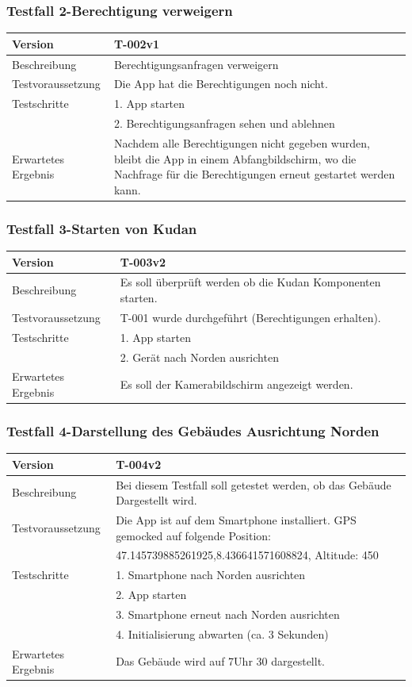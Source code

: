 \documentclass[a4paper]{scrreprt}
\begin{document}
\subsubsection{Testfall 2-Berechtigung verweigern}
\begin{tabularx}{\textwidth}{|l|X|}
\hline 
	Version &
	T-002v1 \\ 
\hline 
	Beschreibung & Berechtigungsanfragen verweigern \\ 
\hline 
	Testvoraussetzung & Die App hat die Berechtigungen noch nicht. \\ 
\hline 
	Testschritte &
		1. App starten \\ &
		2. Berechtigungsanfragen sehen und ablehnen \\
\hline
	Erwartetes Ergebnis & Nachdem alle Berechtigungen nicht gegeben wurden, bleibt die App in einem Abfangbildschirm, wo die Nachfrage für die Berechtigungen erneut gestartet werden kann. \\ 
\hline 
\end{tabularx}
\subsubsection{Testfall 3-Starten von Kudan}
\begin{tabularx}{\textwidth}{|l|X|}
\hline 
	Version &
	T-003v2 \\ 
\hline 
	Beschreibung & 
	Es soll überprüft werden ob die Kudan Komponenten starten.\\ 
\hline 
	Testvoraussetzung &
	T-001 wurde durchgeführt (Berechtigungen erhalten). \\ 
\hline 
	Testschritte &
		1. App starten \\ &
		2. Gerät nach Norden ausrichten \\
\hline
	Erwartetes Ergebnis &
	Es soll der Kamerabildschirm angezeigt werden. \\ 
\hline 
\end{tabularx}
\subsubsection{Testfall 4-Darstellung des Gebäudes Ausrichtung Norden}
\begin{tabularx}{\textwidth}{|l|X|}
\hline 
	Version &
	T-004v2 \\ 
\hline 
	Beschreibung & 
	Bei diesem Testfall soll getestet werden, ob das Gebäude Dargestellt wird.\\ 
\hline 
	Testvoraussetzung &
	Die App ist auf dem Smartphone installiert. GPS gemocked auf folgende Position: \\ & 
		47.145739885261925,8.436641571608824, Altitude: 450 \\ 
\hline 
	Testschritte & 
		1. Smartphone nach Norden ausrichten \\ &
		2. App starten \\ &
		3. Smartphone erneut nach Norden ausrichten \\ &
		4. Initialisierung abwarten (ca. 3 Sekunden)\\
\hline
	Erwartetes Ergebnis &
	Das Gebäude wird auf 7Uhr 30 dargestellt. \\ 
\hline 
\end{tabularx}
\end{document}
